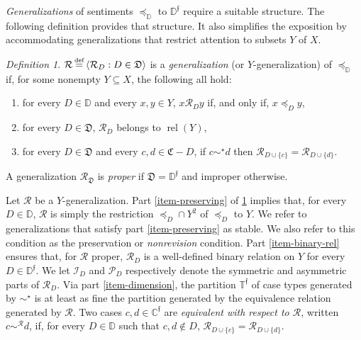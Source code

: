 \documentclass[ecta,nameyear,draft]{econsocart}
\newcommand{\bs}{-}%
\newcommand{\mc}{\mathcal}
\newcommand\defeq{\mathrel{\overset{\makebox[0pt]{\mbox{\normalfont\tiny def}}}{=}}}%
\newcommand{\relations}{\operatorname{rel}}
\newcommand{\novel}{\mathfrak f}
\newcommand{\precsimb}{\mathbin{\preceq}}
\newcommand{\preceqb}{\mathbin{\preceq}}
\newcommand{\ext}{\mathrel{\mc R}}
\newcommand{\sext}{\mathrel{\mc P}}
\newcommand{\next}{\mathrel{\mc I}}
\newcommand{\extb}{\mathbin{\mc R}}
\newcommand{\mbbd}{{\mathds D}}
\newcommand{\mbbdp}{{\mathds D^{\novel}}}
\newcommand{\dpp}{{\mathfrak D}}
\newcommand{\mbbcp}{{\mathds C^{\novel}}}
\newcommand{\cpp}{{\mathfrak C}}
\newcommand{\mbbtp}{{\mathds{T}^\novel}}
\theoremstyle{plain}
\theoremstyle{remark}
\newtheorem{definition}{Definition}%
\begin{document}
\emph{Generalizations} of sentiments $\precsimb_\mbbd$ to $\mbbdp$ require a
suitable structure. The following definition provides that structure. It also
simplifies the exposition by accommodating generalizations that restrict
attention to subsets $Y$ of $X$.
\begin{definition}\label{def-generalization} $\extb \defeq \langle \extb_{D}:
  D\in \dpp \rangle$ is a \emph{{generalization}} (or $Y$-{generalization}) of
  $\preceq_{\mbbd}$ if, for some nonempty $Y \subseteq X$, the following all
  hold$:$
  \begin{enumerate}%
    \item \label{item-preserving} for every $D \in \mbbd$ and every $x,y\in Y$,
      $x \ext_{D} y$ if, and only if, $x \preceq_{D} y$,
    \item\label{item-binary-rel} for every $D\in \dpp$, $\ext_{D}$ belongs to
      $\relations (Y)$,
    \item \label{item-dimension} for every $D\in \dpp$ and every $c,d \in
      \cpp\bs D$,  if $c \sim^\star d$ then $\extb _ {D \cup \{c\}} = \extb _
      {D \cup \{d\}}$.
  \end{enumerate}
  A {generalization} $\ext_{\dpp}$ is \emph{proper} if $\dpp = \mbbdp$ and
  improper otherwise.
\end{definition}
Let $\ext$ be a $Y$-generalization.  Part \ref{item-preserving} of
\cref{def-generalization} implies that, for every $D\in \mbbd$, $\ext$ is
simply the restriction $\preceqb_{D}\cap Y^{2}$ of $\preceq_{D}$ to $Y$. We
refer to generalizations that satisfy part \ref{item-preserving} as stable. We
also refer to this condition as the preservation or \emph{nonrevision}
condition. Part \ref{item-binary-rel} ensures that, for $\ext$ proper,
$\ext_{D}$ is a well-defined binary relation on $Y$ for every $D \in \mbbdp$.
We let $\next_{D}$ and $\sext_{D}$ respectively denote the symmetric and
asymmetric parts of $\ext_{D}$. Via part \ref{item-dimension}, the partition
$\mbbtp$ of case types generated by $\sim^{\star}$ is at least as fine the
partition generated by the equivalence relation generated by $\ext$. Two cases
$c,d \in \mbbcp$ are \emph{equivalent with respect to $\ext$}, written $c
\sim^{\extb}
d$, if, for every $D \in \mbbd$ such that $c,d \notin D$, $\extb_{D \cup \{c\}}
= \extb_{D \cup \{d\}}$.
\end{document}
